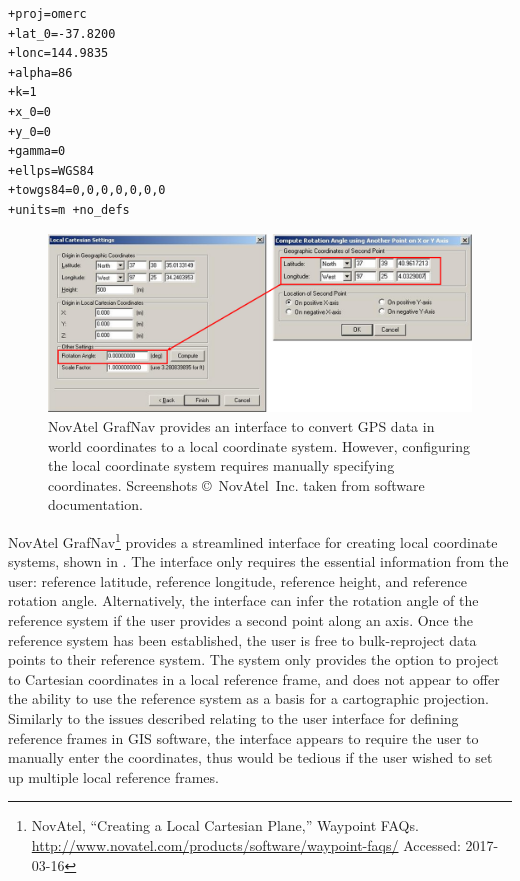 
\begin{lstlisting}[frame=single,caption=Above: Example of a PROJ.4 expression for a Hotine's Oblique Mercator projection centred at the Melbourne Cricket Ground in the direction of the goal posts at N86\textdegree E.,label=lst:proj]
+proj=omerc
+lat_0=-37.8200
+lonc=144.9835
+alpha=86
+k=1
+x_0=0
+y_0=0
+gamma=0
+ellps=WGS84
+towgs84=0,0,0,0,0,0,0
+units=m +no_defs
\end{lstlisting}

\begin{figure}[htbp]
\centering
\includegraphics[width=0.8\linewidth]{figs/spatial/novatel.png}
\caption{NovAtel GrafNav provides an interface to convert GPS data in world coordinates to a local coordinate system. However, configuring the local coordinate system requires manually specifying coordinates. Screenshots \copyright{}~NovAtel~Inc. taken from software documentation. %
\label{fig:novatel}}
\end{figure}

NovAtel GrafNav\footnote{NovAtel, ``Creating a Local Cartesian Plane,''
  Waypoint FAQs. \url{http://www.novatel.com/products/software/waypoint-faqs/}
  Accessed: 2017-03-16} provides a streamlined interface for creating
local coordinate systems, shown in . The interface only requires the essential
information from the user: reference latitude, reference longitude,
reference height, and reference rotation angle. Alternatively, the
interface can infer the rotation angle of the reference system if the
user provides a second point along an axis. Once the reference system
has been established, the user is free to bulk-reproject data points to
their reference system. The system only provides the option to
project to Cartesian coordinates in a local reference frame, and does
not appear to offer the ability to use the reference system as a basis
for a cartographic projection. Similarly to the issues described relating to the user interface for defining reference frames in GIS software, the
interface appears to require the user to manually enter the coordinates,
thus would be tedious if the user wished to set up multiple local
reference frames.

